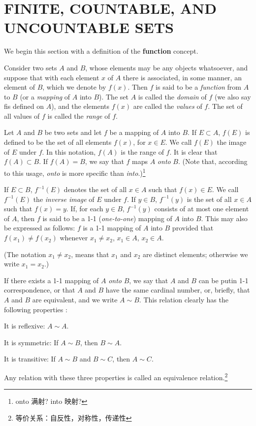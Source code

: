 \section{FINITE, COUNTABLE, AND UNCOUNTABLE SETS}

We begin this section with a definition of the \textbf{function} concept.
\begin{myDefinition}\label{myDefinition:2.1function}
Consider two sets $A$ and $B$, whose elements may be any objects whatsoever, and suppose that with each element $x$ of $A$ there is associated, in some manner, an element of $B$, which we denote by $f(x)$. Then $f$ is said to be a \emph{function} from $A$ to $B$ (or a \emph{mapping} of $A$ into $B$). The set $A$ is called the \emph{domain} of $f$ (we also say fis defined on $A$), and the elements $f(x)$ are called the \emph{values} of $f$. The set of all values of $f$ is called the \emph{range} of $f$.
\end{myDefinition}

\begin{myDefinition}\label{myDefinition:2.2onto_onetoone}
Let $A$ and $B$ be two sets and let $f$ be a mapping of $A$ into $B$.
If $E \subset A$, $f(E)$ is defined to be the set of all elements $f(x)$, for $x \in E$. We call $f(E)$ the image of $E$ under $f$. In this notation, $f(A)$ is the range of $f$. It is clear that $f(A) \subset B$. If $f(A) = B$, we say that $f$ maps $A$ \emph{onto} $B$. (Note that, according
to this usage, \emph{onto} is more specific than \emph{into}.)\footnote{onto 满射? into 映射?} 

If $E \subset B$, $f^{-1}(E)$ denotes the set of all $x \in A$ such that $f(x)\in E$. We call $f^{-1}(E)$ the \emph{inverse image} of $E$ under $f$. If $y \in B$, $f^{-1}(y)$ is the set of all $x \in A$ such that $f(x) =y$. If, for each $y\in B$, $f^{-1}(y)$ consists of at most one element of $A$, then $f$ is said to be a 1-1 (\emph{one-to-one}) mapping of $A$ into $B$. This may also be expressed as follows: $f$ is a 1-1 mapping of $A$ into $B$ provided that $f(x_1) \neq f(x_2)$ whenever $x_1 \neq x_2$, $x_1 \in A$, $x_2 \in A$.

(The notation $x_1 \neq x_2$, means that $x_1$ and $x_2$ are distinct elements; otherwise we write $x_1 = x_2$.)
\end{myDefinition}

\begin{myDefinition}\label{myDefinition:2.3equivalent}
If there exists a 1-1 mapping of $A$ \emph{onto} $B$, we say that $A$ and $B$ can be putin 1-1 correspondence, or that $A$ and $B$ have the same cardinal number, or, briefly, that $A$ and $B$ are equivalent, and we write $A\sim B$. This relation
clearly has the following properties :

It is reflexive: $A\sim A$.

It is symmetric: If $A\sim B$, then $B\sim A$.

It is transitive: If $A\sim B$ and $B\sim C$, then $A\sim C$.

Any relation with these three properties is called an equivalence relation.\footnote{等价关系：自反性，对称性，传递性}
\end{myDefinition}